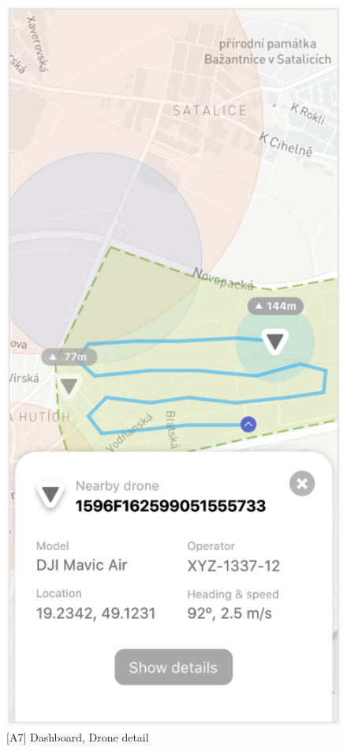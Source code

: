 \begin{figure}
\begin{minipage}{.45\textwidth}
        \includegraphics[width=.7\linewidth]{assets/user_interface_design/dashboard/dashboard_drone_detail.png}
        \caption{[A7] Dashboard, Drone detail}
        \label{fig:dashboard_drone_detail}
    \end{minipage}
    \label{fig:dashboard_all}
\end{figure}
